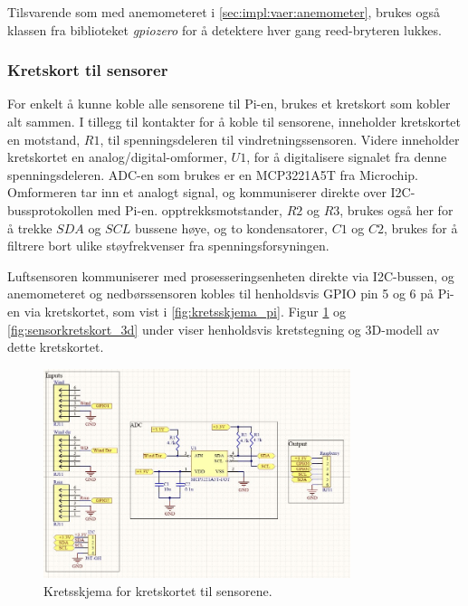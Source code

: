 Tilsvarende som med anemometeret i \autoref{sec:impl:vaer:anemometer}, brukes også klassen  fra biblioteket \textit{gpiozero} for å detektere hver gang reed-bryteren lukkes.

\subsubsection{Kretskort til sensorer}\label{sec:impl:vaer:kretskort}


For enkelt å kunne koble alle sensorene til Pi-en, brukes et kretskort som kobler alt sammen. 
I tillegg til kontakter for å koble til sensorene, inneholder kretskortet en motstand, $R1$, til spenningsdeleren til vindretningssensoren. 
Videre inneholder kretskortet en analog/digital-omformer, $U1$, for å digitalisere signalet fra denne spenningsdeleren. 
ADC-en som brukes er en MCP3221A5T fra Microchip\cite{adc}. 
Omformeren tar inn et analogt signal, og kommuniserer direkte over I2C-bussprotokollen med Pi-en. 
opptrekksmotstander, $R2$ og $R3$, brukes også her for å trekke $SDA$ og $SCL$ bussene høye, og to kondensatorer, $C1$ og $C2$, brukes for å filtrere bort ulike støyfrekvenser fra spenningsforsyningen. 

Luftsensoren kommuniserer med prosesseringsenheten direkte via I2C-bussen, og anemometeret og nedbørssensoren kobles til henholdsvis GPIO pin 5 og 6 på Pi-en via kretskortet, som vist i \autoref{fig:kretsskjema_pi}. 
Figur \ref{fig:sensorkretskort_krets} og \ref{fig:sensorkretskort_3d} under viser henholdsvis kretstegning og 3D-modell av dette kretskortet.

\begin{figure}[H]
    \centering
    \includegraphics[width=0.8\textwidth]{implementering/sensorkretskort_krets.png}
    \caption{Kretsskjema for kretskortet til sensorene.}
    \label{fig:sensorkretskort_krets}
\end{figure}

